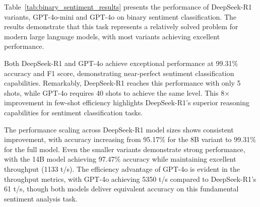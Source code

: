 \documentclass{IEEEcsmag}
\begin{document}
Table~\ref{tab:binary_sentiment_results} presents the performance of DeepSeek-R1 variants, GPT-4o-mini and GPT-4o on binary sentiment classification. The results demonstrate that this task represents a relatively solved problem for modern large language models, with most variants achieving excellent performance.

\begin{table}[ht]
\centering
\small
{}
\caption{Performance on IMDB Movie Reviews dataset (binary sentiment classification) at optimal few-shot settings}
\label{tab:binary_sentiment_results}
\end{table}

Both DeepSeek-R1 and GPT-4o achieve exceptional performance at 99.31\% accuracy and F1 score, demonstrating near-perfect sentiment classification capabilities. Remarkably, DeepSeek-R1 reaches this performance with only 5 shots, while GPT-4o requires 40 shots to achieve the same level. This 8× improvement in few-shot efficiency highlights DeepSeek-R1's superior reasoning capabilities for sentiment classification tasks.

The performance scaling across DeepSeek-R1 model sizes shows consistent improvement, with accuracy increasing from 95.17\% for the 8B variant to 99.31\% for the full model. Even the smaller variants demonstrate strong performance, with the 14B model achieving 97.47\% accuracy while maintaining excellent throughput (1133 t/s). The efficiency advantage of GPT-4o is evident in the throughput metrics, with GPT-4o achieving 5350 t/s compared to DeepSeek-R1's 61 t/s, though both models deliver equivalent accuracy on this fundamental sentiment analysis task.
\end{document}
